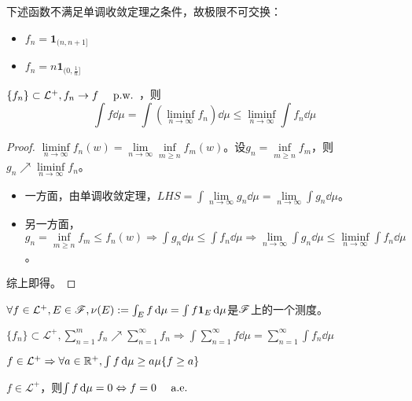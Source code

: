 \documentclass{ctexbook}
\begin{document}
\begin{Rmk}
  下述函数不满足单调收敛定理之条件，故极限不可交换：
  \begin{itemize}
  \item $f_{n}=\bm 1_{(n,n+1]}$
  \item $f_{n}=n\bm 1_{(0,\frac{1}{n}]}$
  \end{itemize}
\end{Rmk}

\begin{Thm}
  $\{f_{n}\}\subset \mathcal{L}^{+},f_{n}\to f \quad \text{ p.w. }$，则
  \[\int f\dd\mu=\int(\liminf_{n\to\infty}f_{n})\dd\mu\leq\liminf_{n\to\infty}\int f_{n}\dd\mu\]
\end{Thm}

\begin{proof}
  $\liminf\limits_{n\to\infty} f_{n}(w)=\lim\limits_{n\to\infty}\inf\limits_{m\geq n}f_{m}(w)$。设$g_{n}=\inf\limits_{m\geq n}f_{m}$，则$g_{n}\nearrow \liminf\limits_{n\to\infty} f_{n}$。
  \begin{itemize}
  \item 一方面，由单调收敛定理，$LHS=\int \lim\limits_{n\to\infty}g_{n}\dd\mu=\lim\limits_{n\to\infty}\int g_{n}\dd\mu$。
  \item 另一方面，$g_{n}=\inf\limits_{m\geq n}f_{m}\leq f_{n}(w)\Rightarrow \int g_{n}\dd\mu\leq\int f_{n}\dd\mu\Rightarrow \lim\limits_{n\to\infty}\int g_{n}\dd\mu\leq \liminf\limits_{n\to\infty}\int f_{n}\dd\mu$。
    \end{itemize}
    综上即得。
\end{proof}

\begin{Eg}
  $\forall f\in\mathcal{L}^{+},E\in\mathscr{F},\nu(E):=\int_{E}f\,\mathrm{d}\mu=\int f\bm 1_{E}\,\mathrm{d}\mu$是$\mathscr{F}$上的一个测度。
\end{Eg}

\begin{Eg}
  $\{f_{n}\}\subset \mathcal{L}^{+},\sum_{n=1}^{m}f_{n}\nearrow \sum_{n=1}^{\infty}f_{n}\Rightarrow \int \sum_{n=1}^{\infty}f\dd\mu=\sum_{n=1}^{\infty}\int f_{n}\dd\mu$
\end{Eg}

\begin{Eg}
  $f\in\mathcal{L^{+}}\Rightarrow \forall a\in\mathbb{R}^{+},\int f\,\mathrm{d}\mu\geq a\mu\{f\geq a\}$
\end{Eg}

\begin{Eg}
  $f\in\mathcal{L^{+}}$，则$\int f\,\mathrm{d}\mu=0\Leftrightarrow f=0\quad \text{ a.e. }$
\end{Eg}
\end{document}
